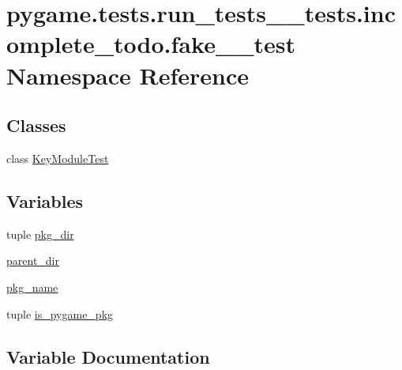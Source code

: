 \hypertarget{namespacepygame_1_1tests_1_1run__tests____tests_1_1incomplete__todo_1_1fake__2__test}{}\section{pygame.\+tests.\+run\+\_\+tests\+\_\+\+\_\+tests.\+incomplete\+\_\+todo.\+fake\+\_\+\_\+test Namespace Reference}
\label{namespacepygame_1_1tests_1_1run__tests____tests_1_1incomplete__todo_1_1fake__2__test}
\subsection*{Classes}
\begin{DoxyCompactItemize}
\item 
class \hyperlink{classpygame_1_1tests_1_1run__tests____tests_1_1incomplete__todo_1_1fake__2__test_1_1_key_module_test}{Key\+Module\+Test}
\end{DoxyCompactItemize}
\subsection*{Variables}
\begin{DoxyCompactItemize}
\item 
tuple \hyperlink{namespacepygame_1_1tests_1_1run__tests____tests_1_1incomplete__todo_1_1fake__2__test_a721799ceb631ebc90776398a29a702c1}{pkg\+\_\+dir}
\item 
\hyperlink{namespacepygame_1_1tests_1_1run__tests____tests_1_1incomplete__todo_1_1fake__2__test_a4db551a21e4352908a4bb22e2d55626a}{parent\+\_\+dir}
\item 
\hyperlink{namespacepygame_1_1tests_1_1run__tests____tests_1_1incomplete__todo_1_1fake__2__test_a17536baabf004f26380933d5bc6179d2}{pkg\+\_\+name}
\item 
tuple \hyperlink{namespacepygame_1_1tests_1_1run__tests____tests_1_1incomplete__todo_1_1fake__2__test_a2854efc457ba2452882b586c538d77dd}{is\+\_\+pygame\+\_\+pkg}
\end{DoxyCompactItemize}


\subsection{Variable Documentation}
\mbox{\label{namespacepygame_1_1tests_1_1run__tests____tests_1_1incomplete__todo_1_1fake__2__test_a2854efc457ba2452882b586c538d77dd}} 
